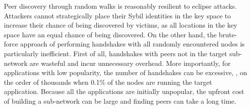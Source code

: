 Peer discovery through random walks is reasonably resilient to eclipse attacks.
Attackers cannot strategically place their Sybil identities in the key space to increase their chance of being discovered by victims, as all locations in the key space have an equal chance of being discovered.
On the other hand, the brute-force approach of performing handshakes with all randomly encountered nodes is particularly inefficient.
First of all, handshakes with peers not in the target sub-network are wasteful and incur unnecessary overhead. %
More importantly, for applications with low popularity, the number of handshakes can be excessive, \ie, on the order of thousands when 0.1\% of the nodes are running the target application.  
Because all the applications are initially unpopular, the upfront cost of building a sub-network can be large and finding peers can take a long time.
